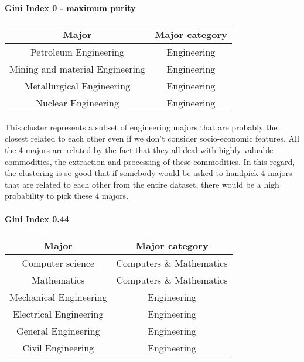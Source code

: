 \documentclass[11pt]{article}
\begin{document}
\paragraph*{Gini Index 0 - maximum purity}

\begin{center}
    \begin{tabular}{||c c||} 
     \hline
     Major & Major category \\ [0.5ex] 
     \hline\hline
     Petroleum Engineering & Engineering \\ 
     \hline
     Mining and material Engineering & Engineering \\
     \hline
     Metallurgical Engineering & Engineering\\
     \hline
     Nuclear Engineering & Engineering\\
     \hline
    \end{tabular}
\end{center}



This cluster represents a subset of engineering majors that are probably the closest related to each other even if we don't consider socio-economic features. All the 4 majors are related by the fact that they all deal with highly valuable commodities, the extraction and processing of these commodities. In this regard, the clustering is so good that if somebody would be asked to handpick 4 majors that are related to each other from the entire dataset, there would be a high probability to pick these 4 majors.

\paragraph*{Gini Index 0.44}

\begin{center}
    \begin{tabular}{||c c||} 
     \hline
     Major & Major category \\ [0.5ex] 
     \hline\hline
     Computer science & Computers \& Mathematics \\ 
     \hline
     Mathematics & Computers \& Mathematics \\
     \hline
     Mechanical Engineering & Engineering\\
     \hline
     Electrical Engineering & Engineering\\
     \hline
     General Engineering & Engineering\\
     \hline
     Civil Engineering & Engineering\\
     \hline
    \end{tabular}
\end{center}
\end{document}
